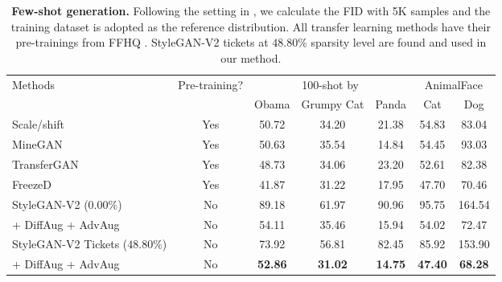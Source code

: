 \documentclass{article}
\begin{document}
\begin{table}[!ht]
\caption{\small \textbf{Few-shot generation.} Following the setting in \cite{zhao2020diffaugment}, we calculate the FID with 5K samples and the training dataset is adopted as the reference distribution. All transfer learning methods have their pre-trainings from FFHQ \cite{karras2019style}. StyleGAN-V2 tickets at $48.80\%$ sparsity level are found and used in our method.}
\vspace{-2mm}
\label{tab:fewshot}
\centering
\small
\begin{tabular}{lcccccc} 
\toprule
\multirow{2}{*}{Methods} & \multirow{2}{*}{Pre-training?} & \multicolumn{3}{c}{100-shot by \cite{zhao2020diffaugment}} & \multicolumn{2}{c}{AnimalFace} \\ \cmidrule(lr){3-5} \cmidrule(lr){6-7}
&  & Obama & Grumpy Cat & Panda & Cat & Dog \\ \midrule
Scale/shift \cite{noguchi2019image} & Yes & 50.72 & 34.20 & 21.38 & 54.83 & 83.04 \\
MineGAN \cite{wang2020minegan} & Yes & 50.63 & 35.54 & 14.84 & 54.45 & 93.03 \\ 
TransferGAN \cite{wang2018transferring} & Yes & 48.73 & 34.06 & 23.20 & 52.61 & 82.38 \\
FreezeD \cite{mo2020freeze} & Yes & 41.87 & 31.22 & 17.95 & 47.70 & 70.46\\ \midrule
StyleGAN-V2 ($0.00\%$) & No & 89.18 & 61.97 & 90.96 & 95.75 & 164.54\\
+ DiffAug + AdvAug & No & 54.11 & 35.46 & 15.94 & 54.02 & 72.47\\ \midrule
StyleGAN-V2 Tickets ($48.80\%$) & No & 73.92 & 56.81 & 82.45 & 85.92 & 153.90\\
+ DiffAug + AdvAug & No & \textbf{52.86} & \textbf{31.02} & \textbf{14.75} & \textbf{47.40} & \textbf{68.28}\\ 
\bottomrule
\end{tabular}
\vspace{-1.5mm}
\end{table}
\end{document}
